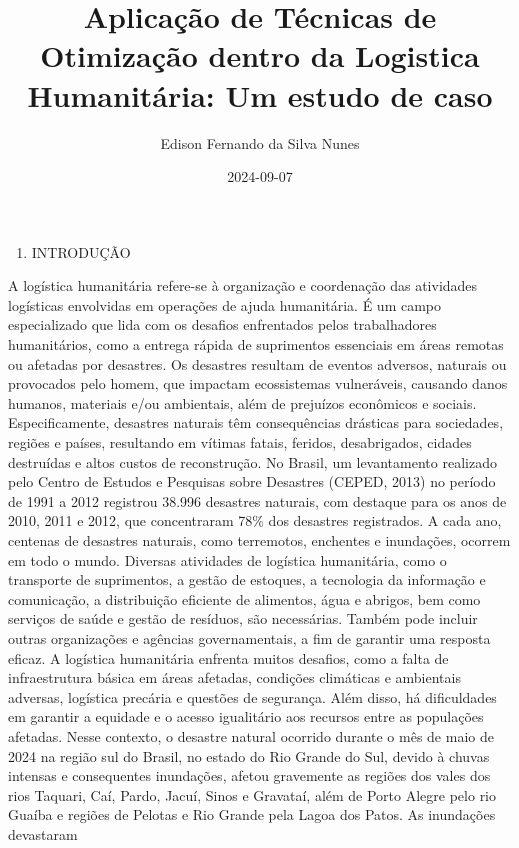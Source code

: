 \documentclass[
]{article}
\title{Aplicação de Técnicas de Otimização dentro da Logistica
Humanitária: Um estudo de caso}
\author{Edison Fernando da Silva Nunes}
\date{2024-09-07}
\providecommand{\tightlist}{%
  \setlength{\itemsep}{0pt}\setlength{\parskip}{0pt}}
\begin{document}
\maketitle

\begin{enumerate}
\def\labelenumi{\arabic{enumi}.}
\tightlist
\item
  INTRODUÇÃO
\end{enumerate}

A logística humanitária refere-se à organização e coordenação das
atividades logísticas envolvidas em operações de ajuda humanitária. É um
campo especializado que lida com os desafios enfrentados pelos
trabalhadores humanitários, como a entrega rápida de suprimentos
essenciais em áreas remotas ou afetadas por desastres. Os desastres
resultam de eventos adversos, naturais ou provocados pelo homem, que
impactam ecossistemas vulneráveis, causando danos humanos, materiais
e/ou ambientais, além de prejuízos econômicos e sociais.
Especificamente, desastres naturais têm consequências drásticas para
sociedades, regiões e países, resultando em vítimas fatais, feridos,
desabrigados, cidades destruídas e altos custos de reconstrução. No
Brasil, um levantamento realizado pelo Centro de Estudos e Pesquisas
sobre Desastres (CEPED, 2013) no período de 1991 a 2012 registrou 38.996
desastres naturais, com destaque para os anos de 2010, 2011 e 2012, que
concentraram 78\% dos desastres registrados. A cada ano, centenas de
desastres naturais, como terremotos, enchentes e inundações, ocorrem em
todo o mundo. Diversas atividades de logística humanitária, como o
transporte de suprimentos, a gestão de estoques, a tecnologia da
informação e comunicação, a distribuição eficiente de alimentos, água e
abrigos, bem como serviços de saúde e gestão de resíduos, são
necessárias. Também pode incluir outras organizações e agências
governamentais, a fim de garantir uma resposta eficaz. A logística
humanitária enfrenta muitos desafios, como a falta de infraestrutura
básica em áreas afetadas, condições climáticas e ambientais adversas,
logística precária e questões de segurança. Além disso, há dificuldades
em garantir a equidade e o acesso igualitário aos recursos entre as
populações afetadas. Nesse contexto, o desastre natural ocorrido durante
o mês de maio de 2024 na região sul do Brasil, no estado do Rio Grande
do Sul, devido à chuvas intensas e consequentes inundações, afetou
gravemente as regiões dos vales dos rios Taquari, Caí, Pardo, Jacuí,
Sinos e Gravataí, além de Porto Alegre pelo rio Guaíba e regiões de
Pelotas e Rio Grande pela Lagoa dos Patos. As inundações devastaram
\end{document}
